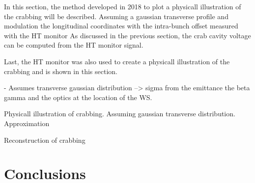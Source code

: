 In this section, the method developed in 2018 to plot a physicall illustration of the crabbing will be described. %
Assuming a gaussian transverse profile and modulation the longitudinal coordinates with the intra-bunch offset measured with the HT monitor
As discussed in the previous section, the crab cavity voltage can be computed from the HT monitor signal. 

Last, the HT monitor was also used to create a physicall illustration of the crabbing and is shown in this section. 

- Assumes transverse gaussian distribution --> sigma from the emittance the beta gamma and the optics at the location of the WS.


Physicall illustration of crabbing. 
Assuming gaussian transverse distribution. Approximation

Reconstruction of crabbing

\section{Conclusions}



